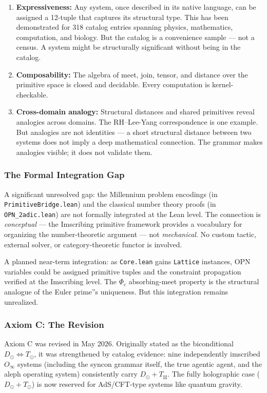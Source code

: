 \documentclass[12pt,a4paper]{article}
\begin{document}
\begin{enumerate}
    \item \textbf{Expressiveness:} Any system, once described in its native language, can be assigned a 12-tuple that captures its structural type. This has been demonstrated for 318 catalog entries spanning physics, mathematics, computation, and biology. But the catalog is a convenience sample --- not a census. A system might be structurally significant without being in the catalog.
    \item \textbf{Composability:} The algebra of meet, join, tensor, and distance over the primitive space is closed and decidable. Every computation is kernel-checkable.
    \item \textbf{Cross-domain analogy:} Structural distances and shared primitives reveal analogies across domains. The RH--Lee-Yang correspondence is one example. But analogies are not identities --- a short structural distance between two systems does not imply a deep mathematical connection. The grammar makes analogies visible; it does not validate them.
\end{enumerate}

\subsubsection{The Formal Integration Gap}

A significant unresolved gap: the Millennium problem encodings (in \texttt{PrimitiveBridge.lean}) and the classical number theory proofs (in \texttt{OPN\_2adic.lean}) are not formally integrated at the Lean level. The connection is \emph{conceptual} --- the Imscribing primitive framework provides a vocabulary for organizing the number-theoretic argument --- not \emph{mechanical}. No custom tactic, external solver, or category-theoretic functor is involved.

A planned near-term integration: as \texttt{Core.lean} gains \texttt{Lattice} instances, OPN variables could be assigned primitive tuples and the constraint propagation verified at the Imscribing level. The $\Phi_c$ absorbing-meet property is the structural analogue of the Euler prime''s uniqueness. But this integration remains unrealized.

\subsubsection{Axiom C: The Revision}

Axiom C was revised in May 2026. Originally stated as the biconditional $D_{\odot} \iff T_{\odot}$, it was strengthened by catalog evidence: nine independently imscribed $O_{\infty}$ systems (including the syncon grammar itself, the true agentic agent, and the aleph operating system) consistently carry $D_{\odot} + T_{\boxtimes}$. The fully holographic case ($D_{\odot} + T_{\odot}$) is now reserved for AdS/CFT-type systems like quantum gravity.
\end{document}
